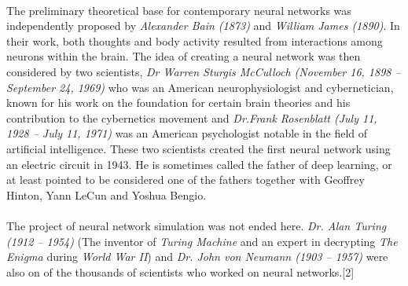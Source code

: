 \documentclass[12pt , a4paper]{article}
\begin{document}
\paragraph{} The preliminary theoretical base for contemporary neural networks was independently proposed by  \textit{Alexander Bain (1873)}   and  \textit{William James (1890)}.  In their work, both thoughts and body activity resulted from interactions among neurons within the brain.
The idea of creating a neural network was then considered by two scientists, \textit{Dr Warren Sturgis McCulloch (November 16, 1898 – September 24, 1969)}  who was an American neurophysiologist and cybernetician, known for his work on the foundation for certain brain theories and his contribution to the cybernetics movement and  \textit{Dr.Frank Rosenblatt (July 11, 1928 – July 11, 1971) }  was an American psychologist notable in the field of artificial intelligence. These two scientists created the first neural network using an electric circuit in 1943. He is sometimes called the father of deep learning, or at least pointed to be considered one of the fathers together with Geoffrey Hinton, Yann LeCun and Yoshua Bengio. \\
\paragraph{} The project of neural network simulation was not ended here. \textit{Dr. Alan Turing (1912 – 1954)} (The inventor of  \textit{Turing Machine }  and an expert in decrypting  \textit{The Enigma} during \textit{World War II})  and \textit{Dr. John von Neumann (1903 – 1957)}   were also on of the thousands of scientists who worked on neural networks.[2]
\end{document}
